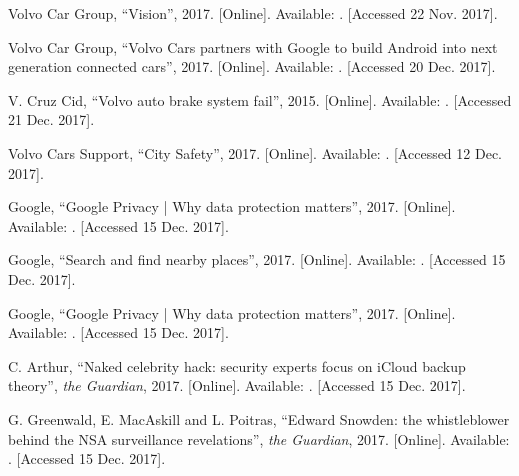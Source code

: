\documentclass[conference]{IEEEtran}
\begin{document}
\begin{thebibliography}{00}
	Volvo Car Group,
	``Vision'',
	2017.
	[Online]. Available: 
	. 
	[Accessed 22 Nov. 2017].
	
	Volvo Car Group,
	``Volvo Cars partners with Google to build Android into next generation connected cars'',
	2017.
	[Online]. Available:
	.
	[Accessed 20 Dec. 2017].
	
	V. Cruz Cid,
	``Volvo auto brake system fail'',
	2015.
	[Online]. Available:
	.
	[Accessed 21 Dec. 2017].
	
	Volvo Cars Support,
	``City Safety'',
	2017.
	[Online]. Available: .
	[Accessed 12 Dec. 2017].
	
	Google, 
	``Google Privacy | Why data protection matters'',
	2017.
	[Online]. Available:
	.
	[Accessed 15 Dec. 2017].
	
	Google,
	``Search and find nearby places'',
	2017.
	[Online]. Available: .
	[Accessed 15 Dec. 2017].
	
	Google,
	``Google Privacy | Why data protection matters'',
	2017.
	[Online]. Available:
	.
	[Accessed 15 Dec. 2017].
	
	C. Arthur,
	``Naked celebrity hack: security experts focus on iCloud backup theory'',
	\emph{the Guardian},
	2017.
	[Online]. Available: .
	[Accessed 15 Dec. 2017].
	
	G. Greenwald, E. MacAskill and L. Poitras,
	``Edward Snowden: the whistleblower behind the NSA surveillance revelations'',
	\emph{the Guardian},
	2017.
	[Online]. Available: .
	[Accessed 15 Dec. 2017].
	

\end{thebibliography}
\end{document}
